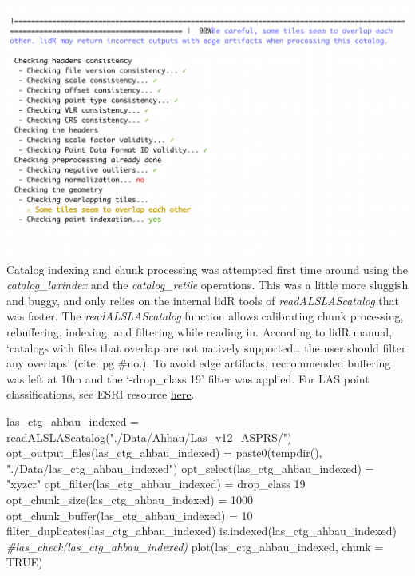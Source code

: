 \documentclass[
]{article}
\newenvironment{Shaded}{\begin{snugshade}}{\end{snugshade}}
\newcommand{\AttributeTok}[1]{\textcolor[rgb]{0.77,0.63,0.00}{#1}}
\newcommand{\CommentTok}[1]{\textcolor[rgb]{0.56,0.35,0.01}{\textit{#1}}}
\newcommand{\ConstantTok}[1]{\textcolor[rgb]{0.00,0.00,0.00}{#1}}
\newcommand{\DecValTok}[1]{\textcolor[rgb]{0.00,0.00,0.81}{#1}}
\newcommand{\FunctionTok}[1]{\textcolor[rgb]{0.00,0.00,0.00}{#1}}
\newcommand{\NormalTok}[1]{#1}
\newcommand{\OtherTok}[1]{\textcolor[rgb]{0.56,0.35,0.01}{#1}}
\newcommand{\StringTok}[1]{\textcolor[rgb]{0.31,0.60,0.02}{#1}}
\begin{document}
\includegraphics{13_lidR_PointCloud_Processing_files/markdown_pngs/tas_ctg_check.png}Catalog
indexing and chunk processing was attempted first time around using the
\emph{catalog\_laxindex} and the \emph{catalog\_retile} operations. This
was a little more sluggish and buggy, and only relies on the internal
lidR tools of \emph{readALSLAScatalog} that was faster. The
\emph{readALSLAScatalog} function allows calibrating chunk processing,
rebuffering, indexing, and filtering while reading in. According to lidR
manual, `catalogs with files that overlap are not natively
supported\ldots{} the user should filter any overlaps' (cite: pg \#no.).
To avoid edge artifacts, reccommended buffering was left at 10m and the
`-drop\_class 19' filter was applied. For LAS point classifications, see
ESRI resource
\href{https://desktop.arcgis.com/en/arcmap/latest/manage-data/las-dataset/lidar-point-classification.htm\#ESRI_SECTION1_FDEB62EB5C2B463F86507C3EE0A7F441}{here}.

\begin{Shaded}
\begin{Highlighting}[]
\NormalTok{las\_ctg\_ahbau\_indexed }\OtherTok{=} \FunctionTok{readALSLAScatalog}\NormalTok{(}\StringTok{"./Data/Ahbau/Las\_v12\_ASPRS/"}\NormalTok{)}
\FunctionTok{opt\_output\_files}\NormalTok{(las\_ctg\_ahbau\_indexed) }\OtherTok{=} \FunctionTok{paste0}\NormalTok{(}\FunctionTok{tempdir}\NormalTok{(), }\StringTok{"./Data/las\_ctg\_ahbau\_indexed"}\NormalTok{)}
\FunctionTok{opt\_select}\NormalTok{(las\_ctg\_ahbau\_indexed) }\OtherTok{=} \StringTok{"xyzcr"}
\FunctionTok{opt\_filter}\NormalTok{(las\_ctg\_ahbau\_indexed) }\OtherTok{=} \StringTok{\textquotesingle{}{-}drop\_class 19\textquotesingle{}} 
\FunctionTok{opt\_chunk\_size}\NormalTok{(las\_ctg\_ahbau\_indexed) }\OtherTok{=} \DecValTok{1000} 
\FunctionTok{opt\_chunk\_buffer}\NormalTok{(las\_ctg\_ahbau\_indexed) }\OtherTok{=} \DecValTok{10}
\FunctionTok{filter\_duplicates}\NormalTok{(las\_ctg\_ahbau\_indexed)}
\FunctionTok{is.indexed}\NormalTok{(las\_ctg\_ahbau\_indexed)}
\CommentTok{\#las\_check(las\_ctg\_ahbau\_indexed)}
\FunctionTok{plot}\NormalTok{(las\_ctg\_ahbau\_indexed, }\AttributeTok{chunk =} \ConstantTok{TRUE}\NormalTok{)}
\end{Highlighting}
\end{Shaded}
\end{document}
